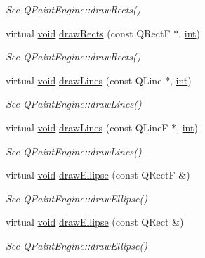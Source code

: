\begin{DoxyCompactItemize}
\begin{DoxyCompactList}\small\item\em See Q\-Paint\-Engine\-::draw\-Rects() \end{DoxyCompactList}\item 
virtual \hyperlink{group___u_a_v_objects_plugin_ga444cf2ff3f0ecbe028adce838d373f5c}{void} \hyperlink{class_qwt_null_paint_device_a78163254e4793afc26b1752178964336}{draw\-Rects} (const Q\-Rect\-F $\ast$, \hyperlink{ioapi_8h_a787fa3cf048117ba7123753c1e74fcd6}{int})
\begin{DoxyCompactList}\small\item\em See Q\-Paint\-Engine\-::draw\-Rects() \end{DoxyCompactList}\item 
virtual \hyperlink{group___u_a_v_objects_plugin_ga444cf2ff3f0ecbe028adce838d373f5c}{void} \hyperlink{class_qwt_null_paint_device_a3a8c7d120fb6d1aa8617037e34df1cf3}{draw\-Lines} (const Q\-Line $\ast$, \hyperlink{ioapi_8h_a787fa3cf048117ba7123753c1e74fcd6}{int})
\begin{DoxyCompactList}\small\item\em See Q\-Paint\-Engine\-::draw\-Lines() \end{DoxyCompactList}\item 
virtual \hyperlink{group___u_a_v_objects_plugin_ga444cf2ff3f0ecbe028adce838d373f5c}{void} \hyperlink{class_qwt_null_paint_device_aa69ee4a20a2d5ff7f11b24db212bc636}{draw\-Lines} (const Q\-Line\-F $\ast$, \hyperlink{ioapi_8h_a787fa3cf048117ba7123753c1e74fcd6}{int})
\begin{DoxyCompactList}\small\item\em See Q\-Paint\-Engine\-::draw\-Lines() \end{DoxyCompactList}\item 
virtual \hyperlink{group___u_a_v_objects_plugin_ga444cf2ff3f0ecbe028adce838d373f5c}{void} \hyperlink{class_qwt_null_paint_device_a36dbf087d462f077808f7d0a4611e572}{draw\-Ellipse} (const Q\-Rect\-F \&)
\begin{DoxyCompactList}\small\item\em See Q\-Paint\-Engine\-::draw\-Ellipse() \end{DoxyCompactList}\item 
virtual \hyperlink{group___u_a_v_objects_plugin_ga444cf2ff3f0ecbe028adce838d373f5c}{void} \hyperlink{class_qwt_null_paint_device_a3a58da653add416644b1ad4e6567871e}{draw\-Ellipse} (const Q\-Rect \&)
\begin{DoxyCompactList}\small\item\em See Q\-Paint\-Engine\-::draw\-Ellipse() \end{DoxyCompactList}\item 

\end{DoxyCompactItemize}
